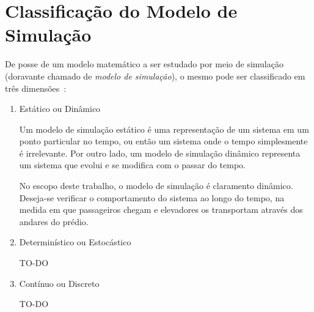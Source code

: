 \section{Classificação do Modelo de Simulação}

De posse de um modelo matemático a ser estudado por meio de simulação (doravante
chamado de \textit{modelo de simulação}), o mesmo pode ser classificado em três
dimensões~\cite{Banks,Law}:

\begin{enumerate}
\item Estático ou Dinâmico

Um modelo de simulação estático é uma representação de um sistema em um ponto
particular no tempo, ou então um sistema onde o tempo simplesmente é
irrelevante. Por outro lado, um modelo de simulação dinâmico representa um
sistema que evolui e se modifica com o passar do tempo.

No escopo deste trabalho, o modelo de simulação é claramento dinâmico. Deseja-se
verificar o comportamento do sistema ao longo do tempo, na medida em que
passageiros chegam e elevadores os transportam através dos andares do prédio.

\item Determinístico ou Estocástico

      TO-DO %

\item Contínuo ou Discreto

      TO-DO %

\end{enumerate}